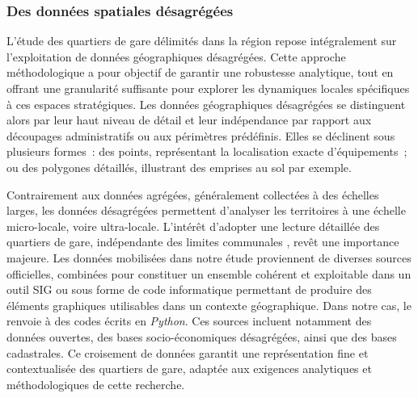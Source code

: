 \begin{refsegment}
\subsubsection*{Des données spatiales désagrégées
    \label{chap3:quartiers-gare-donnees-desagregees}
    }

L’étude des quartiers de gare délimités dans la région repose intégralement sur l’exploitation de données géographiques désagrégées. Cette approche méthodologique a pour objectif de garantir une robustesse analytique, tout en offrant une granularité suffisante pour explorer les dynamiques locales spécifiques à ces espaces stratégiques. Les données géographiques désagrégées se distinguent alors par leur haut niveau de détail et leur indépendance par rapport aux découpages administratifs ou aux périmètres prédéfinis. Elles se déclinent sous plusieurs formes~: des points, représentant la localisation exacte d’équipements~; ou des polygones détaillés, illustrant des emprises au sol par exemple.

Contrairement aux données agrégées, généralement collectées à des échelles larges, les données désagrégées permettent d’analyser les territoires à une échelle micro-locale, voire ultra-locale. L'intérêt d'adopter une lecture détaillée des quartiers de gare, indépendante des limites communales 
\textcolor{blue}{\autocite[7]{moretti_interconnexion_1999}}, revêt une importance majeure. Les données mobilisées dans notre étude proviennent de diverses sources officielles, combinées pour constituer un ensemble cohérent et exploitable dans un outil \acrfull{SIG} ou sous forme de code informatique permettant de produire des éléments graphiques utilisables dans un contexte géographique. Dans notre cas, le  renvoie à des codes écrits en \textsl{Python}. Ces sources incluent notamment des données ouvertes, des bases socio-économiques désagrégées, ainsi que des bases cadastrales. Ce croisement de données garantit une représentation fine et contextualisée des quartiers de gare, adaptée aux exigences analytiques et méthodologiques de cette recherche.%


\end{refsegment}
